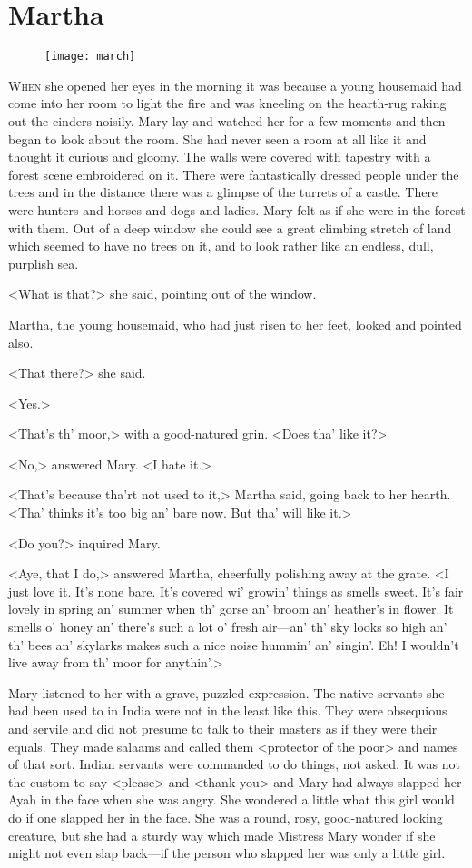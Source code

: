 \chapter{Martha} 
	
\begin{figure}[t!]
\centering
\texttt{[image: march]}
\end{figure}

	\lettrine[]{W}{hen} she opened her eyes in the morning it was because a young housemaid had come into her room to light the fire and was kneeling on the hearth-rug raking out the cinders noisily. Mary lay and watched her for a few moments and then began to look about the room. She had never seen a room at all like it and thought it curious and gloomy. The walls were covered with tapestry with a forest scene embroidered on it. There were fantastically dressed people under the trees and in the distance there was a glimpse of the turrets of a castle. There were hunters and horses and dogs and ladies. Mary felt as if she were in the forest with them. Out of a deep window she could see a great climbing stretch of land which seemed to have no trees on it, and to look rather like an endless, dull, purplish sea.

<What is that?> she said, pointing out of the window.

Martha, the young housemaid, who had just risen to her feet, looked and pointed also.

<That there?> she said.

<Yes.>

<That's th' moor,> with a good-natured grin. <Does tha' like it?>

<No,> answered Mary. <I hate it.>

<That's because tha'rt not used to it,> Martha said, going back to her hearth. <Tha' thinks it's too big an' bare now. But tha' will like it.>

<Do you?> inquired Mary.

<Aye, that I do,> answered Martha, cheerfully polishing away at the grate. <I just love it. It's none bare. It's covered wi' growin' things as smells sweet. It's fair lovely in spring an' summer when th' gorse an' broom an' heather's in flower. It smells o' honey an' there's such a lot o' fresh air—an' th' sky looks so high an' th' bees an' skylarks makes such a nice noise hummin' an' singin'. Eh! I wouldn't live away from th' moor for anythin'.>

Mary listened to her with a grave, puzzled expression. The native servants she had been used to in India were not in the least like this. They were obsequious and servile and did not presume to talk to their masters as if they were their equals. They made salaams and called them <protector of the poor> and names of that sort. Indian servants were commanded to do things, not asked. It was not the custom to say <please> and <thank you> and Mary had always slapped her Ayah in the face when she was angry. She wondered a little what this girl would do if one slapped her in the face. She was a round, rosy, good-natured looking creature, but she had a sturdy way which made Mistress Mary wonder if she might not even slap back—if the person who slapped her was only a little girl.

